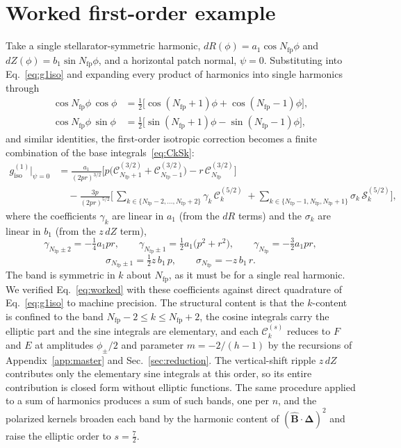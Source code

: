 \documentclass[11pt]{article}
\newcommand{\Del}{\bm{\Delta}}
\newcommand{\Bhat}{\hat{\bm{B}}}
\newcommand{\Nfp}{N_{\mathrm{fp}}}
\newcommand{\Ck}[2]{\mathcal{C}^{(#2)}_{#1}}
\newcommand{\Sk}[2]{\mathcal{S}^{(#2)}_{#1}}
\begin{document}
\section{Worked first-order example}
\label{app:worked}

Take a single stellarator-symmetric harmonic, $dR(\phi)=a_1\cos\Nfp\phi$ and $dZ(\phi)=b_1\sin\Nfp\phi$, and a horizontal patch normal, $\psi=0$. Substituting into Eq.~\eqref{eq:g1iso} and expanding every product of harmonics into single harmonics through
\begin{align}
\cos\Nfp\phi\,\cos\phi&=\tfrac12\big[\cos(\Nfp{+}1)\phi+\cos(\Nfp{-}1)\phi\big],\\
\cos\Nfp\phi\,\sin\phi&=\tfrac12\big[\sin(\Nfp{+}1)\phi-\sin(\Nfp{-}1)\phi\big],
\end{align}
and similar identities, the first-order isotropic correction becomes a finite combination of the base integrals~\eqref{eq:CkSk}:
\begin{align}
g^{(1)}_{\mathrm{iso}}\big|_{\psi=0}
&=\frac{a_1}{(2pr)^{3/2}}\Big[p\big(\Ck{\Nfp+1}{3/2}+\Ck{\Nfp-1}{3/2}\big)-r\,\Ck{\Nfp}{3/2}\Big] \nonumber\\
&\quad-\frac{3p}{(2pr)^{5/2}}\Bigg[\,\sum_{k\in\{\Nfp-2,\dots,\Nfp+2\}}\!\!\gamma_k\,\Ck{k}{5/2}
\;+\!\!\sum_{k\in\{\Nfp-1,\Nfp,\Nfp+1\}}\!\!\sigma_k\,\Sk{k}{5/2}\Bigg],
\label{eq:worked}
\end{align}
where the coefficients $\gamma_k$ are linear in $a_1$ (from the $dR$ terms) and the $\sigma_k$ are linear in $b_1$ (from the $z\,dZ$ term),
\begin{equation}
\gamma_{\Nfp\pm2}=-\tfrac{1}{4}a_1 pr,\qquad
\gamma_{\Nfp\pm1}=\tfrac{1}{2}a_1\big(p^2+r^2\big),\qquad
\gamma_{\Nfp}=-\tfrac{3}{2}a_1 pr,
\end{equation}
\begin{equation}
\sigma_{\Nfp\pm1}=\tfrac{1}{2}z\,b_1\,p,\qquad
\sigma_{\Nfp}=-z\,b_1\,r .
\end{equation}
The band is symmetric in $k$ about $\Nfp$, as it must be for a single real harmonic. We verified Eq.~\eqref{eq:worked} with these coefficients against direct quadrature of Eq.~\eqref{eq:g1iso} to machine precision. The structural content is that the $k$-content is confined to the band $\Nfp-2\le k\le \Nfp+2$, the cosine integrals carry the elliptic part and the sine integrals are elementary, and each $\Ck{k}{s}$ reduces to $F$ and $E$ at amplitudes $\phi_\pm/2$ and parameter $m=-2/(h-1)$ by the recursions of Appendix~\ref{app:master} and Sec.~\ref{sec:reduction}. The vertical-shift ripple $z\,dZ$ contributes only the elementary sine integrals at this order, so its entire contribution is closed form without elliptic functions. The same procedure applied to a sum of harmonics produces a sum of such bands, one per $n$, and the polarized kernels broaden each band by the harmonic content of $(\Bhat\cdot\Del)^2$ and raise the elliptic order to $s=\tfrac72$.
\end{document}
